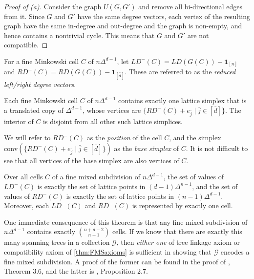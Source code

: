 \documentclass[letterpaper,reqno,11pt]{amsart}
\begin{document}
\begin{proof}[Proof of (a)]
    Consider the graph $U(G, G')$ and remove all bi-directional edges from it. Since $G$ and $G'$ have the same degree vectors, each vertex of the resulting graph have the same in-degree and out-degree and the graph is non-empty, and hence contains a nontrivial cycle. This means that $G$ and $G'$ are not compatible.
\end{proof}

\begin{definition}
    For a fine Minkowski cell $C$ of $n\Delta^{d-1}$, let $LD^-(C) = LD(G(C)) - \mathbf{1}_{[n]}$ and $RD^-(C) = RD(G(C)) - \mathbf{1}_{[\bar{d}]}$. These are referred to as the \emph{reduced left/right degree vectors}.
\end{definition}

\begin{proposition}
    Each fine Minkowski cell $C$ of $n\Delta^{d-1}$ contains exactly one lattice simplex that is a translated copy of $\Delta^{d-1}$, whose vertices are $\{RD^-(C) + e_{\bar{j}} \mid \bar{j}\in [\bar{d}]\}$. The interior of $C$ is disjoint from all other such lattice simplices.
\end{proposition}

We will refer to $RD^-(C)$ as the \emph{position} of the cell $C$, and the simplex $\text{conv}(\{RD^-(C) + e_{\bar{j}} \mid \bar{j}\in [\bar{d}]\})$ as the \emph{base simplex} of $C$. It is not difficult to see that all vertices of the base simplex are also vertices of $C$.

\begin{theorem}\label{thm:treedegrees}
    Over all cells $C$ of a fine mixed subdivision of $n\Delta^{d-1}$, the set of values of $LD^-(C)$ is exactly the set of lattice points in $(d-1)\Delta^{n-1}$, and the set of values of $RD^-(C)$ is exactly the set of lattice points in $(n-1)\Delta^{d-1}$. Moreover, each $LD^-(C)$ and $RD^-(C)$ is represented by exactly one cell.
\end{theorem}

\begin{remark}\label{rem:oneaxiom}
    One immediate consequence of this theorem is that any fine mixed subdivision of $n\Delta^{d-1}$ contains exactly $\binom{n+d-2}{n-1}$ cells. If we know that there are exactly this many spanning trees in a collection $\mathcal{G}$, then \emph{either one} of tree linkage axiom or compatibility axiom of \cref{thm:FMSaxioms} is sufficient in showing that $\mathcal{G}$ encodes a fine mixed subdivision. A proof of the former can be found in the proof of \cite{Trianguloids}, Theorem 3.6, and the latter is \cite{Ensembles}, Proposition 2.7.
\end{remark}
\end{document}
